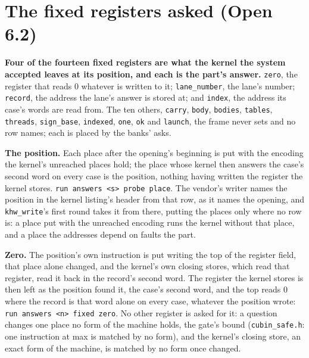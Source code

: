 \section{\texorpdfstring{The fixed registers asked (Open 6.2)}{The fixed registers asked (Open 6.2)}}

\textbf{Four of the fourteen fixed registers are what the kernel the system accepted leaves at its position, and each is the part's answer.} \texttt{zero}, the register that reads 0 whatever is written to it; \texttt{lane\_\allowbreak{}number}, the lane's number; \texttt{record}, the address the lane's answer is stored at; and \texttt{index}, the address its case's words are read from. The ten others, \texttt{carry}, \texttt{body}, \texttt{bodies}, \texttt{tables}, \texttt{threads}, \texttt{sign\_\allowbreak{}base}, \texttt{indexed}, \texttt{one}, \texttt{ok} and \texttt{launch}, the frame never sets and no row names; each is placed by the banks' asks.

\textbf{The position.} Each place after the opening's beginning is put with the encoding the kernel's unreached places hold; the place whose kernel then answers the case's second word on every case is the position, nothing having written the register the kernel stores. \texttt{run answers <s> probe place}. The vendor's writer names the position in the kernel listing's header from that row, as it names the opening, and \texttt{khw\_\allowbreak{}write}'s first round takes it from there, putting the places only where no row is: a place put with the unreached encoding runs the kernel without that place, and a place the addresses depend on faults the part.

\textbf{Zero.} The position's own instruction is put writing the top of the register field, that place alone changed, and the kernel's own closing stores, which read that register, read it back in the record's second word. The register the kernel stores is then left as the position found it, the case's second word, and the top reads 0 where the record is that word alone on every case, whatever the position wrote: \texttt{run answers <n> fixed zero}. No other register is asked for it: a question changes one place no form of the machine holds, the gate's bound (\texttt{cubin\_\allowbreak{}safe.\allowbreak{}h}: one instruction at max is matched by no form), and the kernel's closing store, an exact form of the machine, is matched by no form once changed.

